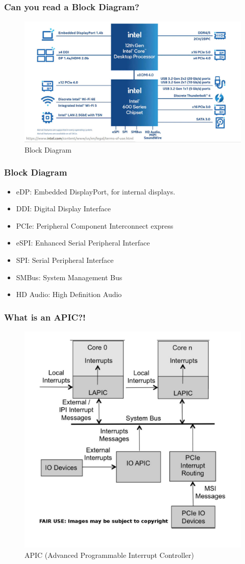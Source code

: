 \documentclass[aspectratio=169, xcolor=table, notheorems, hyperref={pdfpagelabels=false}]{beamer}
\begin{document}
\begin{frame}
\frametitle{Can you read a Block Diagram?}
\begin{figure}
\includegraphics[width=0.79\linewidth]{intel-chipset}
\caption{Block Diagram}
\end{figure}
\end{frame}

\begin{frame}
\frametitle{Block Diagram}
\begin{itemize}
  \item eDP: Embedded DisplayPort, for internal displays.
  \item DDI: Digital Display Interface
  \item PCIe: Peripheral Component Interconnect express
  \item eSPI: Enhanced Serial Peripheral Interface
  \item SPI: Serial Peripheral Interface
  \item SMBus: System Management Bus
  \item HD Audio: High Definition Audio
\end{itemize}
\end{frame}

\begin{frame}
\frametitle{What is an APIC?!}
\begin{figure}
\includegraphics[width=0.44\linewidth]{os00-xapic}
\caption{APIC (Advanced Programmable Interrupt Controller)}
\end{figure}
\end{frame}
\end{document}
